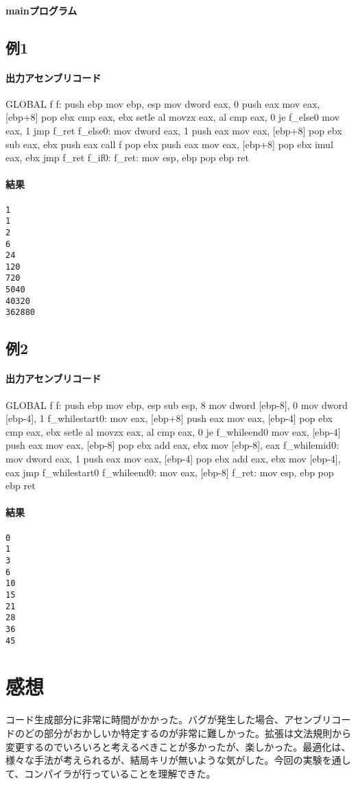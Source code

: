 \documentclass[titlepage, a4paper,12pt]{jarticle}
\begin{document}
\paragraph{mainプログラム}

\subsection{例1}

\paragraph{出力アセンブリコード}
\begin{verbatimtab}[4]
	GLOBAL	f
f:
	push	ebp
	mov	ebp, esp
	mov	dword eax, 0
	push	eax
	mov	eax, [ebp+8]
	pop	ebx
	cmp	eax, ebx
	setle	al
	movzx	eax, al
	cmp	eax, 0
	je	f_else0
	mov	eax, 1
	jmp	f_ret
f_else0:
	mov	dword eax, 1
	push	eax
	mov	eax, [ebp+8]
	pop	ebx
	sub	eax, ebx
	push	eax
	call	f
	pop	ebx
	push	eax
	mov	eax, [ebp+8]
	pop	ebx
	imul	eax, ebx
	jmp	f_ret
f_if0:
f_ret:
	mov	esp, ebp
	pop	ebp
	ret
\end{verbatimtab}
\paragraph{結果}
\begin{verbatim}
1
1
2
6
24
120
720
5040
40320
362880
\end{verbatim}
\subsection{例2}

\paragraph{出力アセンブリコード}
\begin{verbatimtab}[4]
	GLOBAL	f
f:
	push	ebp
	mov	ebp, esp
	sub	esp, 8
	mov	dword [ebp-8], 0
	mov	dword [ebp-4], 1
f_whilestart0:
	mov	eax, [ebp+8]
	push	eax
	mov	eax, [ebp-4]
	pop	ebx
	cmp	eax, ebx
	setle	al
	movzx	eax, al
	cmp	eax, 0
	je	f_whileend0
	mov	eax, [ebp-4]
	push	eax
	mov	eax, [ebp-8]
	pop	ebx
	add	eax, ebx
	mov	[ebp-8], eax
f_whilemid0:
	mov	dword eax, 1
	push	eax
	mov	eax, [ebp-4]
	pop	ebx
	add	eax, ebx
	mov	[ebp-4], eax
	jmp	f_whilestart0
f_whileend0:
	mov	eax, [ebp-8]
f_ret:
	mov	esp, ebp
	pop	ebp
	ret
\end{verbatimtab}
\paragraph{結果}
\begin{verbatim}
0
1
3
6
10
15
21
28
36
45
\end{verbatim}

\section{感想}
コード生成部分に非常に時間がかかった。バグが発生した場合、アセンブリコードのどの部分がおかしいか特定するのが非常に難しかった。拡張は文法規則から変更するのでいろいろと考えるべきことが多かったが、楽しかった。最適化は、様々な手法が考えられるが、結局キリが無いような気がした。今回の実験を通して、コンパイラが行っていることを理解できた。
\end{document}
